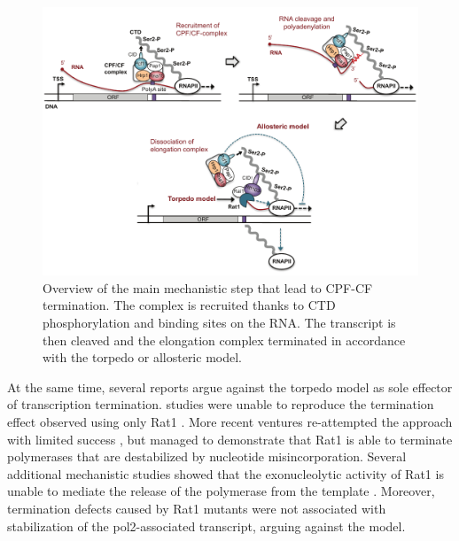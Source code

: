 \begin{figure}[ht]

\centering
\includegraphics[width=\textwidth]{figures/introduction/cpf}
\caption[Mechanism of CPF-CF termination]{Overview of the main mechanistic step that lead to CPF-CF termination. The complex is recruited thanks to CTD phosphorylation and binding sites on the RNA. The transcript is then cleaved and the elongation complex terminated in accordance with the torpedo or allosteric model.}
\label{fig:cpfTermination}

\end{figure}


At the same time, several reports argue against the torpedo model as sole effector of transcription termination.
\Invitro{} studies were unable to reproduce the termination effect observed \invivo{} using only Rat1  \citep{dengl:2009:torpedo}. More recent ventures re-attempted the \invitro{} approach with limited success  \citep{park:2015:unraveling}, but managed to demonstrate that Rat1 is able to terminate polymerases that are destabilized by nucleotide misincorporation.
Several additional mechanistic studies showed that the exonucleolytic activity of Rat1 is unable to mediate the release of the polymerase from the template \citep{luo:2006:role, pearson:2013:dismantling}.
Moreover, termination defects caused by Rat1 mutants were not associated with stabilization of the \gls{pol2}-associated transcript, arguing against the model.

